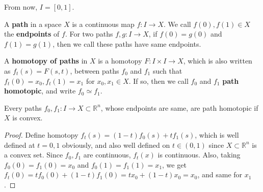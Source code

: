 From now, $I=[0,1]$.

\begin{defn} A \textbf{path} in a space $X$ is a continuous map $f:I\rightarrow X$. We call $f(0),f(1)\in X$ the \textbf{endpoints} of $f$. For two paths $f,g:I\rightarrow X$, if $f(0)=g(0)$ and $f(1)=g(1)$, then we call these paths have same endpoints.
\end{defn}

\begin{defn} A \textbf{homotopy of paths} in $X$ is a homotopy $F:I\times I\rightarrow X$, which is also written as $f_t(s)=F(s,t)$, between paths $f_0$ and $f_1$ such that $f_t(0)=x_0, f_t(1)=x_1$ for $x_0,x_1\in X$. If so, then we call $f_0$ and $f_1$ \textbf{path homotopic}, and write $f_0\simeq f_1$.
\end{defn}

\begin{prop} Every paths $f_0,f_1:I\rightarrow X\subset \mathbb{R}^n$, whose endpoints are same, are path homotopic if $X$ is convex.
\end{prop}
\begin{proof} Define homotopy $f_t(s)=(1-t)f_0(s)+tf_1(s)$, which is well defined at $t=0,1$ obviously, and also well defined on $t\in (0,1)$ since $X\subset \mathbb{R}^n$ is a convex set. Since $f_0,f_1$ are continuous, $f_t(x)$ is continuous. Also, taking $f_0(0)=f_1(0)=x_0$ and $f_0(1)=f_1(1)=x_1$, we get $f_t(0)=tf_0(0)+(1-t)f_1(0)=tx_0+(1-t)x_0=x_0$, and same for $x_1$.
\end{proof}

